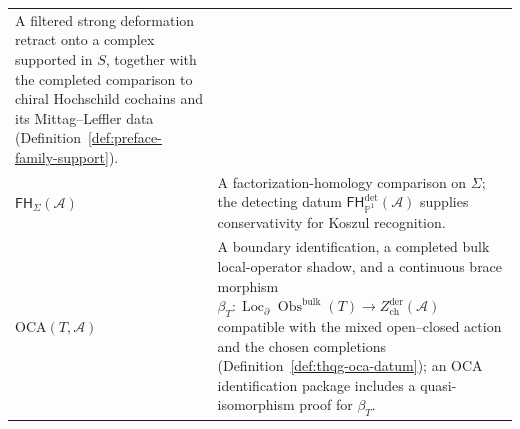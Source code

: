 \documentclass[11pt]{memoir}
\newcommand{\Eone}{\mathsf{E}_1}
\newcommand{\Einf}{\mathsf{E}_{\infty}}
\newcommand{\cA}{\mathcal{A}}
\begin{document}
\begin{center}
\begin{tabular}{@{}p{}p{}@{}}
A filtered strong deformation retract onto a complex supported in
$S$, together with the completed comparison to chiral Hochschild
cochains and its Mittag--Leffler data
(Definition~\ref{def:preface-family-support}).\\
$\mathsf{FH}_{\Sigma}(\cA)$ &
A factorization-homology comparison on $\Sigma$; the detecting datum
$\mathsf{FH}^{\mathrm{det}}_{\mathbb P^1}(\cA)$ supplies
conservativity for Koszul recognition.\\
\textup{OCA}$(T,\cA)$ &
A boundary identification, a completed bulk local-operator shadow,
and a continuous brace morphism
$\beta_T\colon\operatorname{Loc}_{\partial}
\operatorname{Obs}^{\mathrm{bulk}}(T)\to
Z^{\mathrm{der}}_{\mathrm{ch}}(\cA)$ compatible with the mixed
open--closed action and the chosen completions
(Definition~\ref{def:thqg-oca-datum}); an OCA identification package
includes a quasi-isomorphism proof for $\beta_T$.\\
\bottomrule
\end{tabular}
\end{center}

%
%
%





\ifannalsedition
 
\fi



%
%
%
\end{document}
